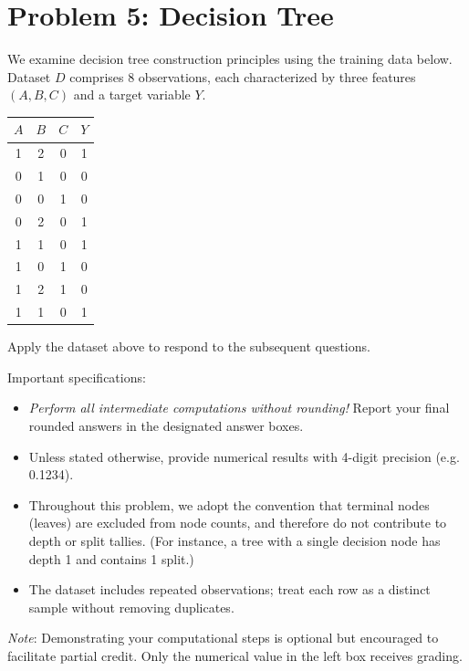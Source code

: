 \documentclass[11pt,addpoints,answers]{exam}
\begin{document}
	\section*{Problem 5: Decision Tree }
	
	We examine decision tree construction principles using the training data below. Dataset \(D\) comprises 8 observations, each characterized by three features \((A, B, C)\) and a target variable \(Y\).
	
	\begin{center}
		\begin{tabular}{|c|c|c|c|}
			\hline
			\(A\) & \(B\) & \(C\) & \(Y\) \\ 
			\hline
			1 & 2 & 0 & 1     \\ 
			\hline
			0 & 1 & 0 & 0     \\ 
			\hline
			0 & 0 & 1 & 0     \\ 
			\hline
			0 & 2 & 0 & 1     \\ 
			\hline
			1 & 1 & 0 & 1     \\ 
			\hline
			1 & 0 & 1 & 0     \\ 
			\hline
			1 & 2 & 1 & 0     \\ 
			\hline
			1 & 1 & 0 & 1     \\ 
			\hline
		\end{tabular}
	\end{center}
	
	Apply the dataset above to respond to the subsequent questions.  
	
	Important specifications:
	\begin{itemize}[leftmargin=*]
		\item \emph{Perform all intermediate computations without rounding!} Report your final rounded answers in the designated answer boxes.
		\item Unless stated otherwise, provide numerical results with 4-digit precision (e.g. 0.1234).
		\item Throughout this problem, we adopt the convention that terminal nodes (leaves) are excluded from node counts, and therefore do not contribute to depth or split tallies. (For instance, a tree with a single decision node has depth 1 and contains 1 split.)
		\item The dataset includes repeated observations; treat each row as a distinct sample without removing duplicates.
	\end{itemize}
	
	\textit{Note}: Demonstrating your computational steps is optional but encouraged to facilitate partial credit. Only the numerical value in the left box receives grading.
	
\end{document}
